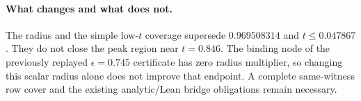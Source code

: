 \paragraph{What changes and what does not.}
The radius and the simple low-$t$ coverage supersede $0.969508314$
and $t\le0.047867$. They do not close the peak region near $t=0.846$.
The binding node of the previously replayed $\epsilon=0.745$ certificate
has zero radius multiplier, so changing this scalar radius alone does
not improve that endpoint. A complete same-witness row cover and the
existing analytic/Lean bridge obligations remain necessary.

